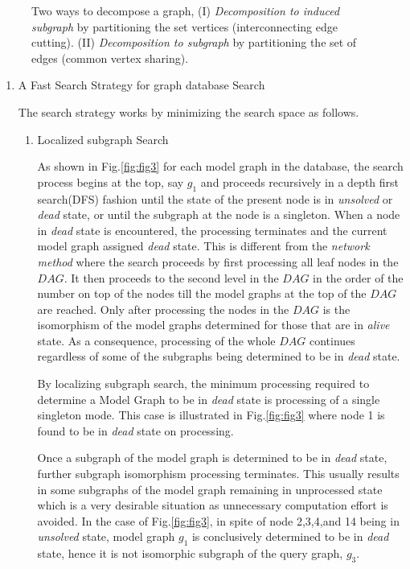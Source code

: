 \begin{figure}
\centering

\caption{Two ways to decompose a graph, (I) \textit{Decomposition to induced subgraph} by partitioning the set vertices (interconnecting edge cutting). (II) \textit{Decomposition to subgraph} by partitioning the set of edges (common vertex sharing).}
\label{fig:fig55}
\end{figure}

\begin{enumerate}

\item A Fast Search Strategy for graph database Search

The search strategy works by minimizing the search space as follows.
\begin{enumerate}
\item{Localized subgraph Search}

As shown in Fig.\ref{fig:fig3} for each model graph in the database, the search process begins at the top, say $g_1$ and proceeds recursively in a depth first search(DFS) fashion until the state of the present node is in \textit{unsolved} or \textit{dead} state, or until the subgraph at the node is a singleton. When a node in \textit{dead} state is encountered, the processing terminates and the current model graph assigned \textit{dead} state. This is different from the \textit{network method} where the search proceeds by first processing all leaf nodes in the $DAG$. It then proceeds to the second level in the $DAG$ in the order of the number on top of the nodes till the model graphs at the top of the $DAG$ are reached. Only after processing the nodes in the $DAG$ is the isomorphism of the model graphs determined for those that are in  \textit{alive} state. As a consequence, processing of the whole $DAG$ continues regardless of some of the subgraphs being determined to be in \textit{dead} state.

By localizing subgraph search, the minimum processing required to determine a Model Graph to be in \textit{dead} state is processing of a single singleton mode. This case is illustrated in Fig.\ref{fig:fig3} where node 1 is found to be in \textit{dead} state on processing.


Once a subgraph of the model graph is determined to be in \textit{dead} state, further subgraph isomorphism processing terminates. This usually results in some subgraphs of the model graph remaining in unprocessed state which is a very desirable situation as unnecessary computation effort is avoided. In the case of Fig.\ref{fig:fig3}, in spite of node 2,3,4,and 14 being in \textit{unsolved} state, model graph $g_1$ is conclusively determined to be in \textit{dead} state, hence it is not isomorphic subgraph of the query graph, $g_3$.


\end{enumerate}
\end{enumerate}
